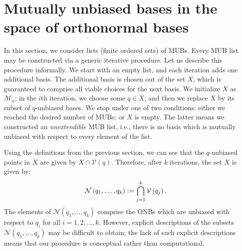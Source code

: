 \documentclass[referee,sn-mathphys-num]{sn-jnl}%
\theoremstyle{thmstyleone}%
\theoremstyle{thmstyletwo}%
\theoremstyle{remark}
\theoremstyle{thmstylethree}%
\newcommand{\defeq}{\vcentcolon=}
\begin{document}
\section{Mutually unbiased bases in the space of orthonormal bases}\label{sec:procedure}
In this section, we consider lists (finite ordered sets) of MUBs. Every MUB list may be constructed via a generic iterative procedure. Let us describe this procedure informally. We start with an empty list, and each iteration adds one additional basis. The additional basis is chosen out of the set $X$, which is guaranteed to comprise all viable choices for the next basis. We initialize $X$ as $\mathcal{M}_n$; in the $i$th iteration, we choose some $q \in X$; and then we replace $X$ by its subset of $q$-unbiased bases. We stop under one of two conditions: either we reached the desired number of MUBs; or $X$ is empty. The latter means we constructed an \textit{unextendible} MUB list, i.e., there is no basis which is mutually unbiased with respect to every element of the list.


Using the definitions from the previous section, we can see that the $q$-unbiased points in $X$ are given by $ X \cap \mathcal{V} \left( q \right) $. Therefore, after $k$ iterations, the set $X$ is given by:
\begin{equation}
	\mathcal{N} \left( q_1, \ldots, q_k \right) \defeq \bigcap_{j=1}^k \mathcal{V} \left( q_j \right) .
\end{equation}
The elements of $\mathcal{N} \left( q_1, \ldots, q_k \right)$ comprise the ONBs which are unbiased with respect to $q_i$ for all $i = 1, 2, \ldots, k$.
However, explicit descriptions of the subsets $ \mathcal{N} \left( q_1, \ldots, q_k \right) $ may be difficult to obtain; the lack of such explicit descriptions means that our procedure is conceptual rather than computational. 
\end{document}
